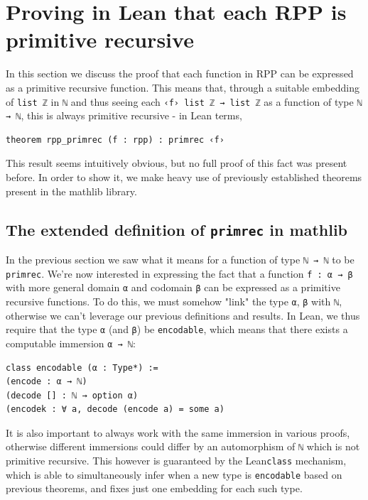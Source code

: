 \documentclass[preprint]{elsarticle}
\theoremstyle{remark}
\newcommand{\RPP}{\textsf{RPP}\xspace}
\newcommand{\MATHLIB}{\textsf{mathlib}\xspace}
\newcommand{\LEAN}{\textsf{Lean}\xspace}
\begin{document}
\section{Proving in \LEAN that each \RPP is primitive recursive}
\label{section:Each RPP is PRF}

In this section we discuss the proof that each function in \RPP can be expressed as a primitive recursive function. This means that, through a suitable embedding of \lstinline|list ℤ| in \lstinline|ℕ| and thus seeing each \lstinline|‹f› list ℤ → list ℤ| as a function of type \lstinline|ℕ → ℕ|, this is always primitive recursive - in \LEAN terms,
\begin{lstlisting}
theorem rpp_primrec (f : rpp) : primrec ‹f›
\end{lstlisting}
This result seems intuitively obvious, but no full proof of this fact was present before. In order to show it, we make heavy use of previously established theorems present in the \MATHLIB library.

\subsection{The extended definition of \texorpdfstring{\normalfont \lstinline{primrec}}{primrec} in \MATHLIB}

In the previous section we saw what it means for a function of type \lstinline|ℕ → ℕ| to be \lstinline|primrec|. We're now interested in expressing the fact that a function \lstinline|f : α → β| with more general domain \lstinline|α| and codomain \lstinline|β| can be expressed as a primitive recursive functions. To do this, we must somehow "link" the type \lstinline|α|, \lstinline|β| with \lstinline|ℕ|, otherwise we can't leverage our previous definitions and results. In \LEAN, we thus require that the type \lstinline|α| (and \lstinline|β|) be \lstinline|encodable|, which means that there exists a computable immersion \lstinline|α → ℕ|:

\begin{lstlisting}
class encodable (α : Type*) :=
(encode : α → ℕ)
(decode [] : ℕ → option α)
(encodek : ∀ a, decode (encode a) = some a)
\end{lstlisting}

It is also important to always work with the same immersion in various proofs, otherwise different immersions could differ by an automorphism of \lstinline|ℕ| which is not primitive recursive. This however is guaranteed by the \LEAN \lstinline|class| mechanism, which is able to simultaneously infer when a new type is \lstinline|encodable| based on previous theorems, and fixes just one embedding for each such type.
\end{document}
